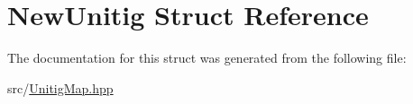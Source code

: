 \hypertarget{structNewUnitig}{}\section{New\+Unitig Struct Reference}
\label{structNewUnitig}


The documentation for this struct was generated from the following file\+:\begin{DoxyCompactItemize}
\item 
src/\hyperlink{UnitigMap_8hpp}{Unitig\+Map.\+hpp}\end{DoxyCompactItemize}
